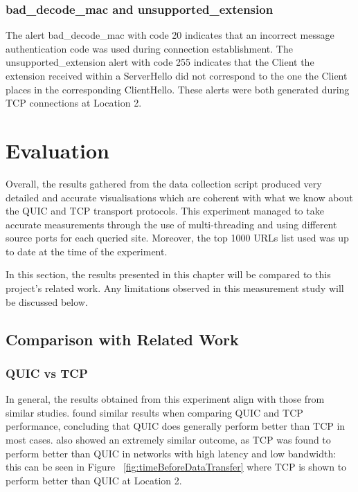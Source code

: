 \documentclass{l4proj}
\begin{document}
\subsubsection{bad\_decode\_mac and unsupported\_extension} The alert bad\_decode\_mac with code 20 indicates that an incorrect message authentication code was used during connection establishment. The unsupported\_extension alert with code 255 indicates that the Client the extension received within a ServerHello did not correspond to the one the Client places in the corresponding ClientHello. These alerts were both generated during TCP connections at Location 2.


\section{Evaluation}

Overall, the results gathered from the data collection script produced very detailed and accurate visualisations which are coherent with what we know about the QUIC and TCP transport protocols. This experiment managed to take accurate measurements through the use of multi-threading and using different source ports for each queried site. Moreover, the top 1000 URLs list used was up to date at the time of the experiment. 

In this section, the results presented in this chapter will be compared to this project's related work. Any limitations observed in this measurement study will be discussed below.

\subsection{Comparison with Related Work}

\subsubsection{QUIC vs TCP} In general, the results obtained from this experiment align with those from similar studies. \citet{Kakh2017} found similar results when comparing QUIC and TCP performance, concluding that QUIC does generally perform better than TCP in most cases. \citet{Grat2016} also showed an extremely similar outcome, as TCP was found to perform better than QUIC in networks with high latency and low bandwidth: this can be seen in Figure ~\ref{fig:timeBeforeDataTransfer} where TCP is shown to perform better than QUIC at Location 2.
\end{document}
